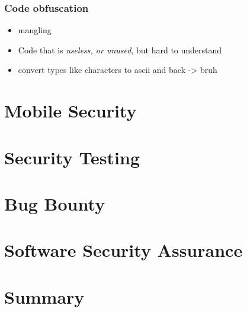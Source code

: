 \documentclass[main.tex,fontsize=8pt,paper=a4,paper=portrait,DIV=calc,]{scrartcl}
\begin{document}
\subsubsection{Code obfuscation}
\begin{itemize}
\item \textcolor{black}{mangling}
\item \textcolor{black}{Code that is \emph{useless, or unused}, but hard to understand}
\item convert types like characters to ascii and back -> bruh
\end{itemize} 

\section{Mobile Security}

\section{Security Testing}

\section{Bug Bounty}

\section{Software Security Assurance}

\section{Summary}


\end{document}
